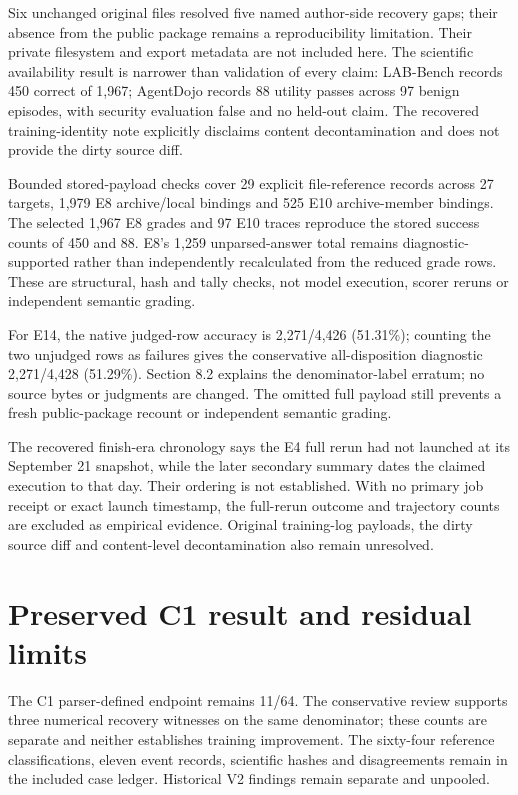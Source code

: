 \documentclass[12pt,a4paper]{report}
\begin{document}
Six unchanged original files resolved five named author-side recovery
gaps; their absence from the public package remains a reproducibility
limitation. Their private filesystem and export metadata are not
included here. The scientific availability result is narrower than
validation of every claim: LAB-Bench records 450 correct of 1,967;
AgentDojo records 88 utility passes across 97 benign episodes, with
security evaluation false and no held-out claim. The recovered
training-identity note explicitly disclaims content decontamination and
does not provide the dirty source diff.

Bounded stored-payload checks cover 29 explicit file-reference records
across 27 targets, 1,979 E8 archive/local bindings and 525 E10
archive-member bindings. The selected 1,967 E8 grades and 97 E10 traces
reproduce the stored success counts of 450 and 88. E8's 1,259
unparsed-answer total remains diagnostic-supported rather than
independently recalculated from the reduced grade rows. These are
structural, hash and tally checks, not model execution, scorer reruns or
independent semantic grading.

For E14, the native judged-row accuracy is 2,271/4,426 (51.31\%);
counting the two unjudged rows as failures gives the conservative
all-disposition diagnostic 2,271/4,428 (51.29\%). Section 8.2 explains
the denominator-label erratum; no source bytes or judgments are changed.
The omitted full payload still prevents a fresh public-package recount
or independent semantic grading.

The recovered finish-era chronology says the E4 full rerun had not
launched at its September 21 snapshot, while the later secondary summary
dates the claimed execution to that day. Their ordering is not
established. With no primary job receipt or exact launch timestamp, the
full-rerun outcome and trajectory counts are excluded as empirical
evidence. Original training-log payloads, the dirty source diff and
content-level decontamination also remain unresolved.

\section{Preserved C1 result and residual
limits}\label{preserved-c1-result-and-residual-limits}

The C1 parser-defined endpoint remains 11/64. The conservative review
supports three numerical recovery witnesses on the same denominator;
these counts are separate and neither establishes training improvement.
The sixty-four reference classifications, eleven event records,
scientific hashes and disagreements remain in the included case ledger.
Historical V2 findings remain separate and unpooled.
\end{document}
